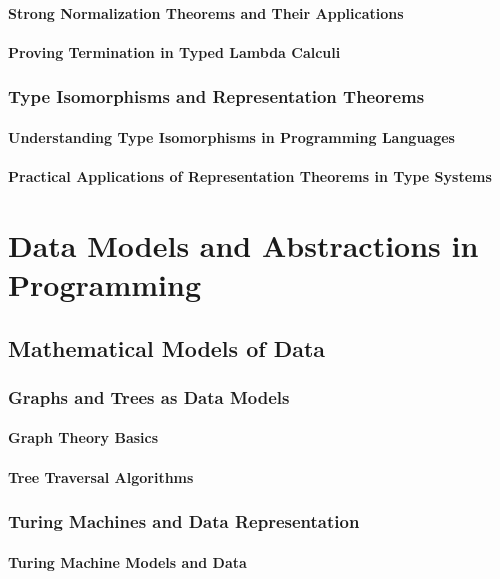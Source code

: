 \documentclass[12pt, oneside]{book}
\begin{document}
\subsubsection{Strong Normalization Theorems and Their Applications}
\subsubsection{Proving Termination in Typed Lambda Calculi}
\subsection{Type Isomorphisms and Representation Theorems}
\subsubsection{Understanding Type Isomorphisms in Programming Languages}
\subsubsection{Practical Applications of Representation Theorems in Type Systems}

\chapter{Data Models and Abstractions in Programming}
\section{Mathematical Models of Data}
\subsection{Graphs and Trees as Data Models}
\subsubsection{Graph Theory Basics}
\subsubsection{Tree Traversal Algorithms}
\subsection{Turing Machines and Data Representation}
\subsubsection{Turing Machine Models and Data}
\end{document}
